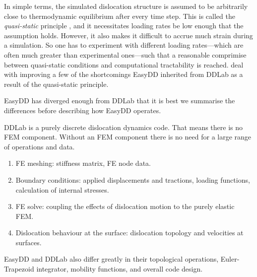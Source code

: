 In simple terms, the simulated dislocation structure is assumed to be arbitrarily close to thermodynamic equilibrium after every time step. This is called the \emph{quasi-static} principle \cite{ddlab,arsenlis2007enabling}, and it necessitates loading rates be low enough that the assumption holds. However, it also makes it difficult to accrue much strain during a simulation. So one has to experiment with different loading rates---which are often much greater than experimental ones---such that a reasonable comprimise between quasi-static conditions and computational tractability is reached.  deal with improving a few of the shortcomings EasyDD inherited from DDLab as a result of the quasi-static principle.

EasyDD has diverged enough from DDLab that it is best we summarise the differences before describing how EasyDD operates.

DDLab is a purely discrete dislocation dynamics code. That means there is no FEM component. Without an FEM component there is no need for a large range of operations and data.
\begin{enumerate}
  \item FE meshing: stiffness matrix, FE node data.
  \item Boundary conditions: applied displacements and tractions, loading functions, calculation of internal stresses.
  \item FE solve: coupling the effects of dislocation motion to the purely elastic FEM.
  \item Dislocation behaviour at the surface: dislocation topology and velocities at surfaces.
\end{enumerate}
EasyDD and DDLab also differ greatly in their topological operations, Euler-Trapezoid integrator, mobility functions, and overall code design.

